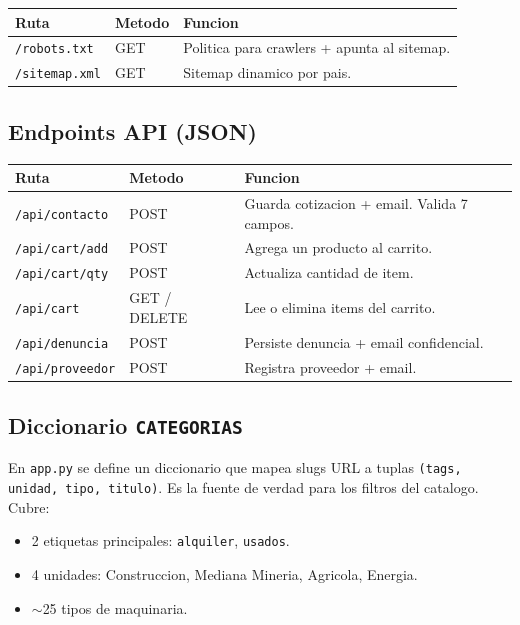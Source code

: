 \documentclass[11pt,a4paper]{article}
\begin{document}
\begin{longtable}{p{5cm} p{2cm} p{8.5cm}}
\toprule
\textbf{Ruta} & \textbf{Metodo} & \textbf{Funcion} \\
\midrule
\endhead
\texttt{/robots.txt}    & GET & Politica para crawlers + apunta al sitemap. \\
\texttt{/sitemap.xml}   & GET & Sitemap dinamico por pais. \\
\bottomrule
\end{longtable}

\subsection{Endpoints API (JSON)}

\begin{longtable}{p{4.5cm} p{2cm} p{8.5cm}}
\toprule
\textbf{Ruta} & \textbf{Metodo} & \textbf{Funcion} \\
\midrule
\endhead
\texttt{/api/contacto}    & POST          & Guarda cotizacion + email. Valida 7 campos. \\
\texttt{/api/cart/add}    & POST          & Agrega un producto al carrito. \\
\texttt{/api/cart/qty}    & POST          & Actualiza cantidad de item. \\
\texttt{/api/cart}        & GET / DELETE  & Lee o elimina items del carrito. \\
\texttt{/api/denuncia}    & POST          & Persiste denuncia + email confidencial. \\
\texttt{/api/proveedor}   & POST          & Registra proveedor + email. \\
\bottomrule
\end{longtable}

\subsection{Diccionario \texttt{CATEGORIAS}}

En \texttt{app.py} se define un diccionario que mapea slugs URL a tuplas
\texttt{(tags, unidad, tipo, titulo)}. Es la fuente de verdad para los
filtros del catalogo. Cubre:

\begin{itemize}[leftmargin=*]
    \item 2 etiquetas principales: \texttt{alquiler}, \texttt{usados}.
    \item 4 unidades: Construccion, Mediana Mineria, Agricola, Energia.
    \item $\sim$25 tipos de maquinaria.
\end{itemize}
\end{document}
